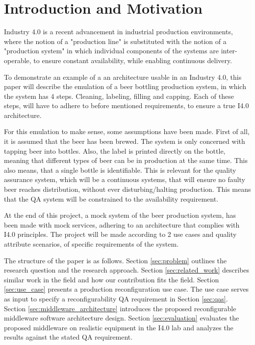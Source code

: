 \section{Introduction and Motivation}
Industry 4.0 is a recent advancement in industrial production environments, where the notion of a "production line" is substituted with the notion of a "production system" in which individual components of the systems are inter-operable, to ensure constant availability, while enabling continuous delivery. 

To demonstrate an example of a an architecture usable in an Industry 4.0, this paper will describe the emulation of a beer bottling production system, in which the system has 4 steps. Cleaning, labeling, filling and capping. Each of these steps, will have to adhere to before mentioned requirements, to ensure a true I4.0 architecture. 

For this emulation to make sense, some assumptions have been made. First of all, it is assumed that the beer has been brewed. The system is only concerned with tapping beer into bottles. Also, the label is printed directly on the bottle, meaning that different types of beer can be in production at the same time. This also means, that a single bottle is identifiable. This is relevant for the quality assurance system, which will be a continuous systems, that will ensure no faulty beer reaches distribution, without ever disturbing/halting production. This means that the QA system will be constrained to the availability requirement.

At the end of this project, a mock system of the beer production system, has been made with mock services, adhering to an architecture that complies with I4.0 principles. The project will be made according to 2 use cases and quality attribute scenarios, of specific requirements of the system.

The structure of the paper is as follows. 
Section \ref{sec:problem} outlines the research question and the research approach. 
Section \ref{sec:related_work} describes similar work in the field and how our contribution fits the field.
Section \ref{sec:use_case} presents a production reconfiguration use case.
The use case serves as input to specify a reconfigurability QA requirement in Section \ref{sec:qas}.
Section \ref{sec:middleware_architecture} introduces the proposed reconfigurable middleware software architecture design.
Section \ref{sec:evaluation} evaluates the proposed middleware on realistic equipment in the I4.0 lab and analyzes the results against the stated QA requirement.  